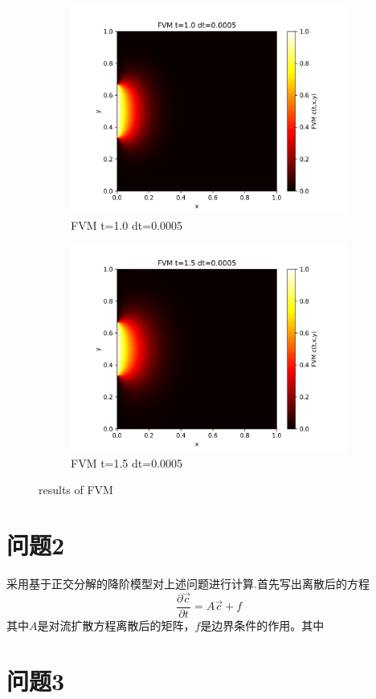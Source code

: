 \documentclass[11pt,a4 paper,one side]{article}
\begin{document}
\begin{figure}[htbp]
    \vspace{0.5cm}  %
    
    \begin{subfigure}{0.45\textwidth}
        \includegraphics[width=\textwidth]{FVM t=1.0 dt=0.0005.png}
        \caption{FVM t=1.0 dt=0.0005}
        \label{FVM t=1.0 dt=0.0005}
    \end{subfigure}
    \hfill
    \begin{subfigure}{0.45\textwidth}
        \includegraphics[width=\textwidth]{FVM t=1.5 dt=0.0005.png}
        \caption{FVM t=1.5 dt=0.0005}
        \label{FVM t=1.5 dt=0.0005}
    \end{subfigure}
    
    \caption{results of FVM}
    \label{results of FVM}
\end{figure}

\section{问题2}
采用基于正交分解的降阶模型对上述问题进行计算.首先写出离散后的方程\begin{equation}
    \frac{\partial \vec{c}}{\partial t} = A\vec{c}+f
\end{equation}
其中$A$是对流扩散方程离散后的矩阵，$f$是边界条件的作用。其中
\section{问题3}
\end{document}

